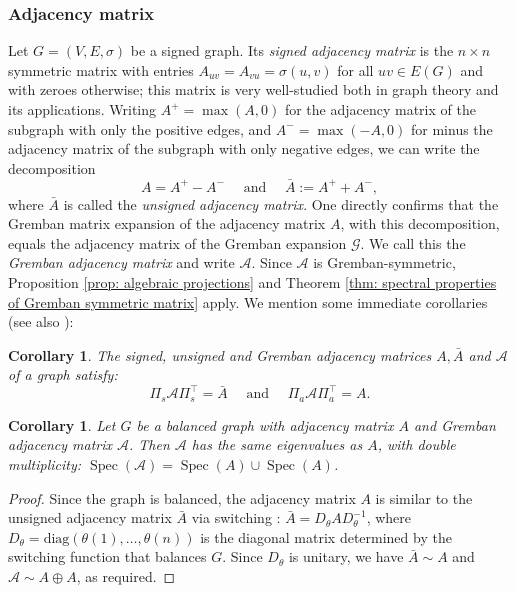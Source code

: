 \documentclass[reprint,onecolumn]{article}
\newtheorem{corollary}[theorem]{Corollary}
\newcommand{\mc}[1]{\mathcal{#1}}
\newcommand{\1}{\mathbb{1}}
\newcommand{\0}{\mathbf{0}}
\newcommand{\diag}{\textrm{diag}}
\DeclareMathOperator\spec{Spec}
\begin{document}
\subsubsection{Adjacency matrix} Let $G=(V,E,\sigma)$ be a signed graph. Its \emph{signed adjacency matrix} is the $n\times n$ symmetric matrix with entries $A_{uv}=A_{vu}=\sigma(u,v)$ for all $uv\in E(G)$ and with zeroes otherwise; this matrix is very well-studied both in graph theory and its applications. Writing $A^+=\max(A,0)$ for the adjacency matrix of the subgraph with only the positive edges, and $A^-=\max(-A,0)$ for {minus} the adjacency matrix of the subgraph with only negative edges, we can write the decomposition
$$
A = A^+-A^- \quad\text{~and~}\quad \bar{A} := A^++A^-,
$$
where $\bar{A}$ is called the \emph{unsigned adjacency matrix}. One directly confirms that the Gremban matrix expansion of the adjacency matrix $A$, with this decomposition, equals the adjacency matrix of the Gremban expansion $\mathcal{G}$. We call this the \emph{Gremban adjacency matrix} and write $\mathcal{A}$. Since $\mathcal{A}$ is Gremban-symmetric, Proposition \ref{prop: algebraic projections} and Theorem \ref{thm: spectral properties of Gremban symmetric matrix} apply. We mention some immediate corollaries (see also \cite{fox2017numerical}):
\begin{corollary}   
    The signed, unsigned and Gremban adjacency matrices $A,\bar{A}$ and $\mathcal{A}$ of a graph satisfy:
    $$
    \Pi_s\mathcal{A}\Pi_s^\top = \bar{A} \quad\text{~and~}\quad \Pi_a\mathcal{A}\Pi_a^\top = A.
    $$
\end{corollary}

\begin{corollary}
    Let $G$ be a balanced graph with adjacency matrix $A$ and Gremban adjacency matrix $\mathcal{A}$. Then $\mc A$ has the same eigenvalues as $A$, with double multiplicity: $\spec(\mc A) = \spec( A)\cup \spec(A)$.
\end{corollary}

\begin{proof}
    Since the graph is balanced, the adjacency matrix $A$ is similar to the unsigned adjacency matrix $\bar A$ via switching \cite{diaz2025mathematical,zaslavsky2013matrices}: $\bar A=D_\theta A D_\theta^{-1}$, where $D_\theta=\diag(\theta(1),\dots,\theta(n))$ is the diagonal matrix determined by the switching function that balances $G$. Since $D_\theta$ is unitary, we have $\bar{A}\sim A$ and $\mathcal{A}\sim A\oplus A$, as required.
\end{proof}
\end{document}
